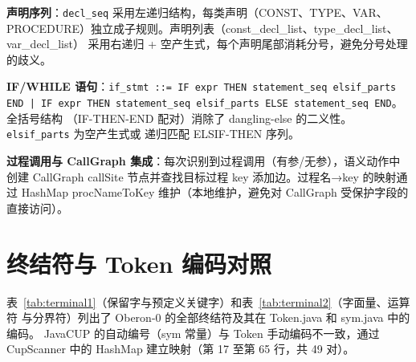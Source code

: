 \documentclass[a4paper]{article}
\begin{document}
\textbf{声明序列}：\texttt{decl\_seq} 采用左递归结构，每类声明（CONST、TYPE、VAR、
PROCEDURE）独立成子规则。声明列表（const\_decl\_list、type\_decl\_list、var\_decl\_list）
采用右递归 + 空产生式，每个声明尾部消耗分号，避免分号处理的歧义。

\textbf{IF/WHILE 语句}：\texttt{if\_stmt ::= IF expr THEN statement\_seq elsif\_parts
END | IF expr THEN statement\_seq elsif\_parts ELSE statement\_seq END}。全括号结构
（IF-THEN-END 配对）消除了 dangling-else 的二义性。\texttt{elsif\_parts} 为空产生式或
递归匹配 ELSIF-THEN 序列。

\textbf{过程调用与 CallGraph 集成}：每次识别到过程调用（有参/无参），语义动作中创建
CallGraph callSite 节点并查找目标过程 key 添加边。过程名→key 的映射通过 HashMap
procNameToKey 维护（本地维护，避免对 CallGraph 受保护字段的直接访问）。

\section{终结符与 Token 编码对照}

表~\ref{tab:terminal1}（保留字与预定义关键字）和表~\ref{tab:terminal2}（字面量、运算符
与分界符）列出了 Oberon-0 的全部终结符及其在 Token.java 和 sym.java 中的编码。
JavaCUP 的自动编号（sym 常量）与 Token 手动编码不一致，通过 CupScanner 中的
HashMap 建立映射（第 17 至第 65 行，共 49 对）。
\end{document}
